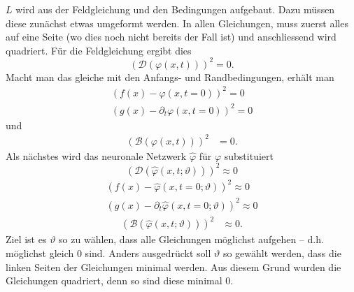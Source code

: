 \( L \) wird aus der Feldgleichung und den Bedingungen aufgebaut. Dazu müssen diese zunächst etwas umgeformt werden.
In allen Gleichungen, muss zuerst alles auf eine Seite (wo dies noch nicht bereits der Fall ist) und anschliessend wird quadriert.
Für die Feldgleichung ergibt dies
\begin{equation}
    \left(\mathcal{D}(\varphi(x, t))\right)^2 = 0.
    \label{neuronal:feldgleichung_umformuliert}
\end{equation}
Macht man das gleiche mit den Anfangs- und Randbedingungen, erhält man
\begin{equation}
    \begin{aligned}
        \left(f(x) - \varphi(x, t = 0)\right)^2 = 0\\
        \left(g(x) - \partial_t \varphi(x, t = 0)\right)^2 = 0
    \end{aligned}
    \label{neuronal:anfangsbedingung_umformuliert}
\end{equation}
und
\begin{equation}
    \begin{aligned}
        \left(\mathcal{B}(\varphi(x, t))\right)^2 &= 0.
    \end{aligned}
    \label{neuronal:randbedingung_umformuliert}
\end{equation}
Als nächstes wird das neuronale Netzwerk $\hat{\varphi}$ für $\varphi$ substituiert
\begin{equation}
    \left(\mathcal{D}(\hat{\varphi}(x, t; \vartheta))\right)^2 \approx 0
    \label{neuronal:feldgleichung_umformuliert_netz}
\end{equation}
\begin{equation}
    \begin{aligned}
        \left(f(x) - \hat{\varphi}(x, t = 0; \vartheta)\right)^2 \approx 0\\
        \left(g(x) - \partial_t \hat{\varphi}(x, t = 0; \vartheta)\right)^2 \approx 0
    \end{aligned}
    \label{neuronal:anfangsbedingung_umformuliert_netz}
\end{equation}
\begin{equation}
    \begin{aligned}
        \left(\mathcal{B}(\hat{\varphi}(x, t; \vartheta))\right)^2 &\approx 0.
    \end{aligned}
    \label{neuronal:randbedingung_umformuliert_netz}
\end{equation}
Ziel ist es $\vartheta$ so zu wählen, dass alle Gleichungen möglichst aufgehen -- d.h. möglichst gleich 0 sind.
Anders ausgedrückt soll $\vartheta$ so gewählt werden, dass die linken Seiten der Gleichungen minimal werden.
Aus diesem Grund wurden die Gleichungen quadriert, denn so sind diese minimal 0.

